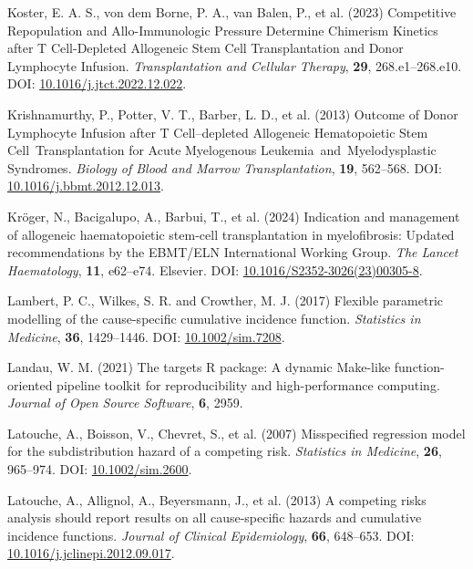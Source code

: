 \documentclass[
  letterpaper,
  DIV=11,
  numbers=noendperiod]{scrreprt}
\newlength{\cslhangindent}
\newenvironment{CSLReferences}[2] %
 {\begin{list}{}{%
  \setlength{\itemindent}{0pt}
  \setlength{\leftmargin}{0pt}
  \setlength{\parsep}{0pt}
  \ifodd #1
   \setlength{\leftmargin}{\cslhangindent}
   \setlength{\itemindent}{-1\cslhangindent}
  \fi
  \setlength{\itemsep}{#2\baselineskip}}}
 {\end{list}}
\begin{document}
\begin{CSLReferences}{1}{1}
Koster, E. A. S., von dem Borne, P. A., van Balen, P., et al. (2023)
Competitive {Repopulation} and {Allo-Immunologic Pressure Determine
Chimerism Kinetics} after {T Cell-Depleted Allogeneic Stem Cell
Transplantation} and {Donor Lymphocyte Infusion}. \emph{Transplantation
and Cellular Therapy}, \textbf{29}, 268.e1--268.e10. DOI:
\href{https://doi.org/10.1016/j.jtct.2022.12.022}{10.1016/j.jtct.2022.12.022}.

Krishnamurthy, P., Potter, V. T., Barber, L. D., et al. (2013) Outcome
of {Donor Lymphocyte Infusion} after {T Cell}--depleted {Allogeneic
Hematopoietic Stem Cell~Transplantation} for {Acute Myelogenous
Leukemia}~and~{Myelodysplastic Syndromes}. \emph{Biology of Blood and
Marrow Transplantation}, \textbf{19}, 562--568. DOI:
\href{https://doi.org/10.1016/j.bbmt.2012.12.013}{10.1016/j.bbmt.2012.12.013}.

Kröger, N., Bacigalupo, A., Barbui, T., et al. (2024) Indication and
management of allogeneic haematopoietic stem-cell transplantation in
myelofibrosis: Updated recommendations by the {EBMT}/{ELN International
Working Group}. \emph{The Lancet Haematology}, \textbf{11}, e62--e74.
Elsevier. DOI:
\href{https://doi.org/10.1016/S2352-3026(23)00305-8}{10.1016/S2352-3026(23)00305-8}.

Lambert, P. C., Wilkes, S. R. and Crowther, M. J. (2017) Flexible
parametric modelling of the cause-specific cumulative incidence
function. \emph{Statistics in Medicine}, \textbf{36}, 1429--1446. DOI:
\href{https://doi.org/10.1002/sim.7208}{10.1002/sim.7208}.

Landau, W. M. (2021) The targets {R} package: A dynamic {Make-like}
function-oriented pipeline toolkit for reproducibility and
high-performance computing. \emph{Journal of Open Source Software},
\textbf{6}, 2959.

Latouche, A., Boisson, V., Chevret, S., et al. (2007) Misspecified
regression model for the subdistribution hazard of a competing risk.
\emph{Statistics in Medicine}, \textbf{26}, 965--974. DOI:
\href{https://doi.org/10.1002/sim.2600}{10.1002/sim.2600}.

Latouche, A., Allignol, A., Beyersmann, J., et al. (2013) A competing
risks analysis should report results on all cause-specific hazards and
cumulative incidence functions. \emph{Journal of Clinical Epidemiology},
\textbf{66}, 648--653. DOI:
\href{https://doi.org/10.1016/j.jclinepi.2012.09.017}{10.1016/j.jclinepi.2012.09.017}.


\end{CSLReferences}
\end{document}

